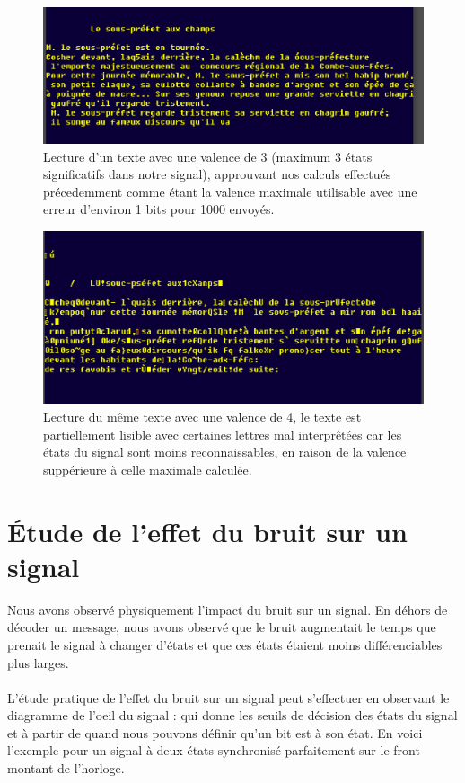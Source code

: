 \begin{figure}[H]
      \centering
      \includegraphics[width=\textwidth - \textwidth / 5]{ressources/r305/00.png}
      \caption{Lecture d'un texte avec une valence de 3 (maximum 3 états significatifs dans notre signal), approuvant nos calculs effectués précedemment comme étant la valence maximale utilisable avec une erreur d'environ 1 bits pour 1000 envoyés.}
      \label{fig:r3051}
  \end{figure}

\begin{figure}[H]
      \centering
      \includegraphics[width=\textwidth - \textwidth / 5]{ressources/r305/01.png}
      \caption{Lecture du même texte avec une valence de 4, le texte est partiellement lisible avec certaines lettres mal interprêtées car les états du signal sont moins reconnaissables, en raison de la valence suppérieure à celle maximale calculée.}
      \label{fig:r3052}
\end{figure}

\section{Étude de l'effet du bruit sur un signal}

Nous avons observé physiquement l'impact du bruit sur un signal. En déhors de décoder un message, nous avons observé que le bruit augmentait le temps que prenait le signal à changer d'états et que ces états étaient moins différenciables plus larges.
\\ \\
L'étude pratique de l'effet du bruit sur un signal peut s'effectuer en observant le diagramme de l'oeil du signal : qui donne les seuils de décision des états du signal et à partir de quand nous pouvons définir qu'un bit est à son état. En voici l'exemple pour un signal à deux états synchronisé parfaitement sur le front montant de l'horloge.

